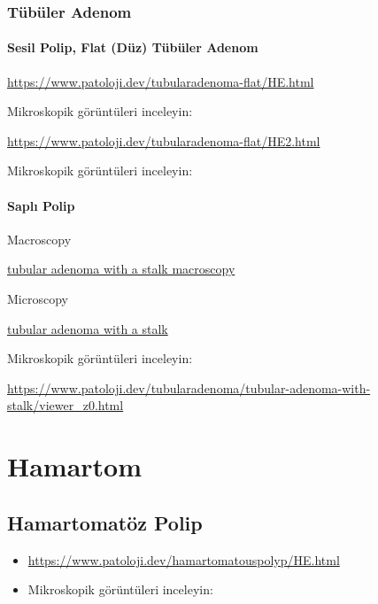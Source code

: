 \documentclass[
  letterpaper,
  DIV=11,
  numbers=noendperiod]{scrreprt}
\begin{document}
\hypertarget{tuxfcbuxfcler-adenom}{%
\subsection{Tübüler Adenom}\label{tuxfcbuxfcler-adenom}}

\hypertarget{sesil-polip-flat-duxfcz-tuxfcbuxfcler-adenom}{%
\subsubsection{Sesil Polip, Flat (Düz) Tübüler
Adenom}\label{sesil-polip-flat-duxfcz-tuxfcbuxfcler-adenom}}

\url{https://www.patoloji.dev/tubularadenoma-flat/HE.html}

Mikroskopik görüntüleri inceleyin:

\url{https://www.patoloji.dev/tubularadenoma-flat/HE2.html}

Mikroskopik görüntüleri inceleyin:

\hypertarget{saplux131-polip}{%
\subsubsection{Saplı Polip}\label{saplux131-polip}}

Macroscopy

\href{https://www.patoloji.dev/tubularadenoma/tubular-adenoma-with-stalk-macroscopy.jpg}{tubular
adenoma with a stalk macroscopy}

Microscopy

\href{https://www.patoloji.dev/tubularadenoma/tubular-adenoma-with-stalk.jpeg}{tubular
adenoma with a stalk}

Mikroskopik görüntüleri inceleyin:

\url{https://www.patoloji.dev/tubularadenoma/tubular-adenoma-with-stalk/viewer_z0.html}

\hypertarget{hamartom}{%
\chapter{Hamartom}\label{hamartom}}

\hypertarget{hamartomatuxf6z-polip}{%
\section{Hamartomatöz Polip}\label{hamartomatuxf6z-polip}}

\begin{itemize}
\item
  \url{https://www.patoloji.dev/hamartomatouspolyp/HE.html}
\item
  Mikroskopik görüntüleri inceleyin:
\end{itemize}
\end{document}
